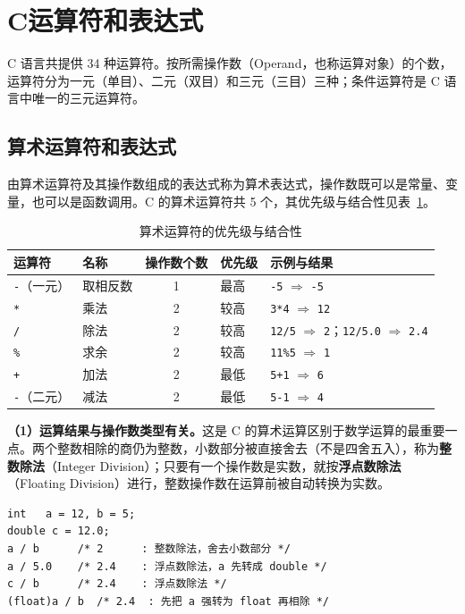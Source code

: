 \lstset{language=C}

\section{C运算符和表达式}

C 语言共提供 34 种运算符。按所需操作数（Operand，也称运算对象）的个数，运算符分为一元（单目）、二元（双目）和三元（三目）三种；条件运算符是 C 语言中唯一的三元运算符。

\subsection{算术运算符和表达式}

由算术运算符及其操作数组成的表达式称为算术表达式，操作数既可以是常量、变量，也可以是函数调用。C 的算术运算符共 5 个，其优先级与结合性见表~\ref{tab:arith-op}。

\begin{table}[htbp]
\centering
\caption{算术运算符的优先级与结合性}\label{tab:arith-op}
\small
\begin{tabularx}{\textwidth}{@{}llclX@{}}
\toprule
运算符 & 名称 & 操作数个数 & 优先级 & 示例与结果 \\
\midrule
\texttt{-}（一元） & 取相反数 & 1 & 最高 & \texttt{-5} $\Rightarrow$ \texttt{-5} \\
\texttt{*} & 乘法 & 2 & 较高 & \texttt{3*4} $\Rightarrow$ \texttt{12} \\
\texttt{/} & 除法 & 2 & 较高 & \texttt{12/5} $\Rightarrow$ \texttt{2}；\texttt{12/5.0} $\Rightarrow$ \texttt{2.4} \\
\texttt{\%} & 求余 & 2 & 较高 & \texttt{11\%5} $\Rightarrow$ \texttt{1} \\
\texttt{+} & 加法 & 2 & 最低 & \texttt{5+1} $\Rightarrow$ \texttt{6} \\
\texttt{-}（二元） & 减法 & 2 & 最低 & \texttt{5-1} $\Rightarrow$ \texttt{4} \\
\bottomrule
\end{tabularx}
\end{table}

\textbf{（1）运算结果与操作数类型有关。}这是 C 的算术运算区别于数学运算的最重要一点。两个整数相除的商仍为整数，小数部分被直接舍去（不是四舍五入），称为\textbf{整数除法}（Integer Division）；只要有一个操作数是实数，就按\textbf{浮点数除法}（Floating Division）进行，整数操作数在运算前被自动转换为实数。

\begin{lstlisting}
int   a = 12, b = 5;
double c = 12.0;
a / b      /* 2      : 整数除法，舍去小数部分 */
a / 5.0    /* 2.4    : 浮点数除法，a 先转成 double */
c / b      /* 2.4    : 浮点数除法 */
(float)a / b  /* 2.4  : 先把 a 强转为 float 再相除 */
\end{lstlisting}

